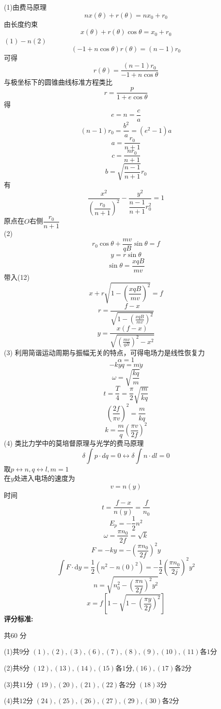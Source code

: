 \documentclass{article}
\begin{document}
\[\]
(1)由费马原理
\[
n x \left( \theta\right) +r\left( \theta\right) =nx_{0}+r_{0}
\tag{1}
\]
由长度约束
\[
x \left( \theta \right) +r\left(\theta\right)  \cos\theta =x_{0}+r_{0}
\tag{2}
\]
$(1)-n(2)$
\[
\left( -1+n\cos \theta \right) r\left( \theta \right) =\left(n-1\right) r_{0}
\tag{3}
\]
可得
\[
r\left( \theta \right) =\dfrac{\left( n-1\right) r_{0}}{-1+n\cos \theta }
\tag{4}
\]
与极坐标下的圆锥曲线标准方程类比
\[
r=\dfrac{p}{1+e\cos \theta }
\tag{5}
\]
得
\[
e=n=\dfrac{c}{a}
\tag{6}
\]
\[
\left( n-1\right) r _{0}=\dfrac{b^{2}}{a}=\left( e^{2}-1\right) a
\tag{7}
\]
\[
a=\dfrac{r_{0}}{n+1}
\tag{8}
\]
\[
c=\dfrac{nr_{0}}{n+1}
\tag{9}
\]
\[
b=\sqrt{\dfrac{n-1}{n+1}}r_{0}
\tag{10}
\]
有
\[
\dfrac{x^{2}}{\left( \dfrac{r_{0}}{n+1}\right) ^{2}}-\dfrac{y^2}{\dfrac{n-1}{n+1}r_0^{2}}=1
\tag{11}
\]
原点在$O$右侧$\dfrac{r_0}{n+1}$
\[\]
(2)
\[r_0\cos\theta +\dfrac{mv}{qB}\sin \theta =f
\tag{12}
\]
\[
y=r\sin \theta 
\tag{13}
\]
\[
\sin \theta =\dfrac{xqB}{mv}
\tag{14}
\]
带入(12)
\[
x+r\sqrt{ {1-\left( \dfrac{xqB}{mv}\right) ^{2}}}=f
\tag{15}
\]
\[
r=\dfrac{f-x}{\sqrt{1-\left( \frac{xqB}{mv}\right) ^{2}}}
\tag{16}
\]
\[
y=\dfrac{x\left( f- x\right) }{\sqrt{\left( \frac{mv}{qB}\right) ^{2}-x^{2}}}
\tag{17}
\]
(3)
利用简谐运动周期与振幅无关的特点，可得电场力是线性恢复力
\[
\alpha =1
\tag{18}
\]
\[
-kyq=m\ddot{y}
\tag{19}
\]
\[
\omega=\sqrt{\dfrac{kq}{m}}
\tag{20}
\]
\[
t=\dfrac{T}{4}=\dfrac{\pi }{2}\sqrt{\dfrac{m}{kq}}
\tag{21}
\]
\[
\left( \dfrac{2f}{\pi v}\right) ^{2}=\dfrac{m}{kq}
\]
\[
k=\dfrac{m}{q}\left( \dfrac{\pi v}{2f}\right) ^{2}
\tag{22}
\]
(4)
类比力学中的莫培督原理与光学的费马原理
\[\delta \int p\cdot dq=0\leftrightarrow \delta \int n\cdot dl=0
\]
取$p\leftrightarrow n,q\leftrightarrow l,m=1$
\[\]
在$y$处进入电场的速度为
\[
v=n(y)
\tag{23}
\]
时间
\[
t=\dfrac{f-x}{n\left( y\right) }=\dfrac{f}{n_{0}}
\tag{24}
\]
\[
E_p=-\dfrac{1}{2}n^{2}
\tag{25}
\]
\[
\omega=\dfrac{\pi n_{0}}{2f}=\sqrt{k}
\tag{26}
\]
\[
F=-ky=-\left(\dfrac{\pi n_{0}}{2f}\right) ^{2}y
\tag{27}
\]
\[
\int F\cdot \mathrm{d}y=\dfrac{1}{2}\left( n^{2}-n(0)^2\right) =-\dfrac{1}{2}\left(\dfrac{\pi n_{0}}{2j}\right) ^{2}y^{2} 
\tag{28}
\]
\[
n=\sqrt{ n_{0}^{2}-\left(\dfrac{\pi n}{2f}\right) ^{2}y^{2}}
\tag{29}
\]
\[
x=f\left[ 1-\sqrt{1-\left( \dfrac{\pi y}{2f}\right) ^{2}}\right]
\tag{30}
\]
\textbf{评分标准:}\par
共$60$ 分\par
(1)共$9$分 $(1),(2),(3),(6),(7),(8),(9),(10),(11)$各$1$分\par
(2)共$8$分 $(12),(13),(14),(15)$各$1$分,$(16),(17)$各$2$分\par
(3)共$11$分 $(19),(20),(21),(22)$各$2$分 $(18)$$3$分\par
(4)共$12$分 $(24),(25),(26),(27),(29),(30)$各$2$分 \par
\end{document}
